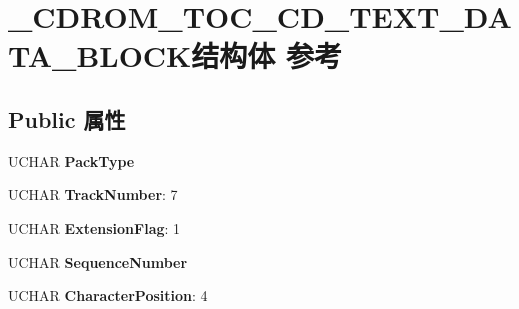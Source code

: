 \hypertarget{struct___c_d_r_o_m___t_o_c___c_d___t_e_x_t___d_a_t_a___b_l_o_c_k}{}\section{\+\_\+\+C\+D\+R\+O\+M\+\_\+\+T\+O\+C\+\_\+\+C\+D\+\_\+\+T\+E\+X\+T\+\_\+\+D\+A\+T\+A\+\_\+\+B\+L\+O\+C\+K结构体 参考}
\label{struct___c_d_r_o_m___t_o_c___c_d___t_e_x_t___d_a_t_a___b_l_o_c_k}
\subsection*{Public 属性}
\begin{DoxyCompactItemize}
\item 
\mbox{\label{struct___c_d_r_o_m___t_o_c___c_d___t_e_x_t___d_a_t_a___b_l_o_c_k_a2cea28293611347ccc761ad3fd516a55}} 
U\+C\+H\+AR {\bfseries Pack\+Type}
\item 
\mbox{\label{struct___c_d_r_o_m___t_o_c___c_d___t_e_x_t___d_a_t_a___b_l_o_c_k_a7c4a536e5331375ee7325da0b7bedd82}} 
U\+C\+H\+AR {\bfseries Track\+Number}\+: 7
\item 
\mbox{\label{struct___c_d_r_o_m___t_o_c___c_d___t_e_x_t___d_a_t_a___b_l_o_c_k_a8c0197d2126d091ee7ca390327f21d30}} 
U\+C\+H\+AR {\bfseries Extension\+Flag}\+: 1
\item 
\mbox{\label{struct___c_d_r_o_m___t_o_c___c_d___t_e_x_t___d_a_t_a___b_l_o_c_k_ab2d55b319646f46c033803f506f92906}} 
U\+C\+H\+AR {\bfseries Sequence\+Number}
\item 
\mbox{\label{struct___c_d_r_o_m___t_o_c___c_d___t_e_x_t___d_a_t_a___b_l_o_c_k_a708bf53f3b60167f90f1f4bd9395088d}} 
U\+C\+H\+AR {\bfseries Character\+Position}\+: 4
\item 
\mbox{\label{struct___c_d_r_o_m___t_o_c___c_d___t_e_x_t___d_a_t_a___b_l_o_c_k_a25f348bb58f243a01a85fc867ccf8edd}} 

\end{DoxyCompactItemize}
